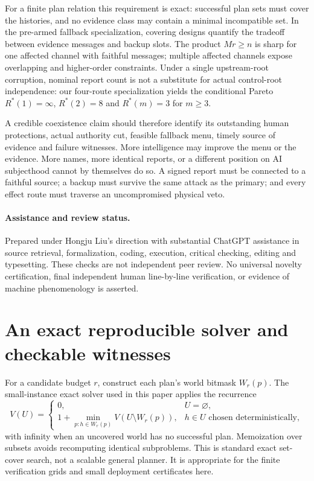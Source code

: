 \documentclass[11pt,a4paper]{article}
\theoremstyle{definition}\newtheorem{definition}{Definition}
\begin{document}
For a finite plan relation this requirement is exact: successful plan sets must cover the histories, and no evidence class may contain a minimal incompatible set. In the pre-armed fallback specialization, covering designs quantify the tradeoff between evidence messages and backup slots. The product $Mr\geq n$ is sharp for one affected channel with faithful messages; multiple affected channels expose overlapping and higher-order constraints. Under a single upstream-root corruption, nominal report count is not a substitute for actual control-root independence: our four-route specialization yields the conditional Pareto $R^*(1)=\infty$, $R^*(2)=8$ and $R^*(m)=3$ for $m\ge3$.

A credible coexistence claim should therefore identify its outstanding human protections, actual authority cut, feasible fallback menu, timely source of evidence and failure witnesses. More intelligence may improve the menu or the evidence. More names, more identical reports, or a different position on AI subjecthood cannot by themselves do so. A signed report must be connected to a faithful source; a backup must survive the same attack as the primary; and every effect route must traverse an uncompromised physical veto.

\paragraph{Assistance and review status.}
Prepared under Hongju Liu's direction with substantial ChatGPT assistance in source retrieval, formalization, coding, execution, critical checking, editing and typesetting. These checks are not independent peer review. No universal novelty certification, final independent human line-by-line verification, or evidence of machine phenomenology is asserted.

\appendix
\section{An exact reproducible solver and checkable witnesses}
For a candidate budget $r$, construct each plan's world bitmask $W_r(p)$. The small-instance exact solver used in this paper applies the recurrence
\begin{equation}
V(U)=\begin{cases}
0,&U=\varnothing,\\
1+\min_{p:h\in W_r(p)}V(U\setminus W_r(p)),&h\in U\text{ chosen deterministically},
\end{cases}
\end{equation}
with infinity when an uncovered world has no successful plan. Memoization over subsets avoids recomputing identical subproblems. This is standard exact set-cover search, not a scalable general planner. It is appropriate for the finite verification grids and small deployment certificates here.
\end{document}
